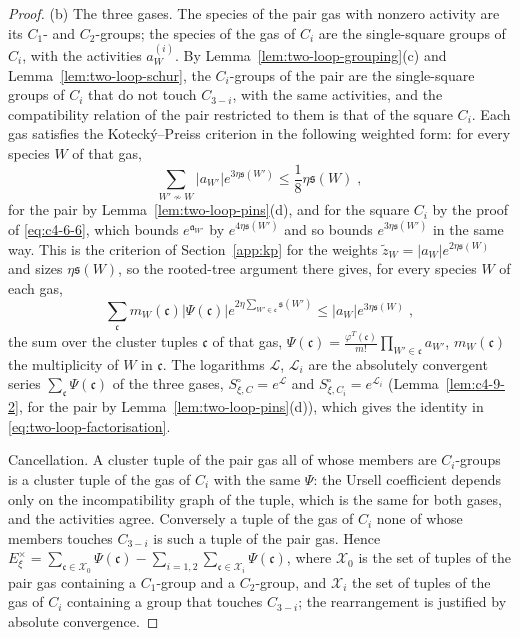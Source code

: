 \begin{proof}
(b) The three gases. The species of the pair gas with nonzero activity are its $C_1$- and $C_2$-groups; the species of the gas of $C_i$ are the single-square groups of $C_i$, with the activities $a^{(i)}_W$. By Lemma~\ref{lem:two-loop-grouping}(c) and Lemma~\ref{lem:two-loop-schur}, the $C_i$-groups of the pair are the single-square groups of $C_i$ that do not touch $C_{3-i}$, with the same activities, and the compatibility relation of the pair restricted to them is that of the square $C_i$. Each gas satisfies the Kotecký--Preiss criterion in the following weighted form: for every species $W$ of that gas,
\begin{equation}\label{eq:two-loop-weighted-kp}
    \sum_{W'\not\sim W}|a_{W'}|e^{3\eta\mathfrak s(W')}\leq\frac18\eta\mathfrak s(W)\;,
\end{equation}
for the pair by Lemma~\ref{lem:two-loop-pins}(d), and for the square $C_i$ by the proof of \eqref{eq:c4-6-6}, which bounds $e^{\mathfrak a_{W'}}$ by $e^{4\eta\mathfrak s(W')}$ and so bounds $e^{3\eta\mathfrak s(W')}$ in the same way. This is the criterion of Section~\ref{app:kp} for the weights $\widetilde z_W=|a_W|e^{2\eta\mathfrak s(W)}$ and sizes $\eta\mathfrak s(W)$, so the rooted-tree argument there gives, for every species $W$ of each gas,
\begin{equation}\label{eq:two-loop-pinned-cluster}
    \sum_{\mathfrak c}m_W(\mathfrak c)|\Psi(\mathfrak c)|e^{2\eta\sum_{W'\in\mathfrak c}\mathfrak s(W')}\leq|a_W|e^{3\eta\mathfrak s(W)}\;,
\end{equation}
the sum over the cluster tuples $\mathfrak c$ of that gas, $\Psi(\mathfrak c)=\frac{\varphi^T(\mathfrak c)}{m!}\prod_{W'\in\mathfrak c}a_{W'}$, $m_W(\mathfrak c)$ the multiplicity of $W$ in $\mathfrak c$. The logarithms $\mathscr L$, $\mathscr L_i$ are the absolutely convergent series $\sum_{\mathfrak c}\Psi(\mathfrak c)$ of the three gases, $S^\circ_{\xi,C}=e^{\mathscr L}$ and $S^\circ_{\xi,C_i}=e^{\mathscr L_i}$ (Lemma~\ref{lem:c4-9-2}, for the pair by Lemma~\ref{lem:two-loop-pins}(d)), which gives the identity in \eqref{eq:two-loop-factorisation}.

Cancellation. A cluster tuple of the pair gas all of whose members are $C_i$-groups is a cluster tuple of the gas of $C_i$ with the same $\Psi$: the Ursell coefficient depends only on the incompatibility graph of the tuple, which is the same for both gases, and the activities agree. Conversely a tuple of the gas of $C_i$ none of whose members touches $C_{3-i}$ is such a tuple of the pair gas. Hence $E^\times_\xi=\sum_{\mathfrak c\in\mathcal X_0}\Psi(\mathfrak c)-\sum_{i=1,2}\sum_{\mathfrak c\in\mathcal X_i}\Psi(\mathfrak c)$, where $\mathcal X_0$ is the set of tuples of the pair gas containing a $C_1$-group and a $C_2$-group, and $\mathcal X_i$ the set of tuples of the gas of $C_i$ containing a group that touches $C_{3-i}$; the rearrangement is justified by absolute convergence.


\end{proof}
